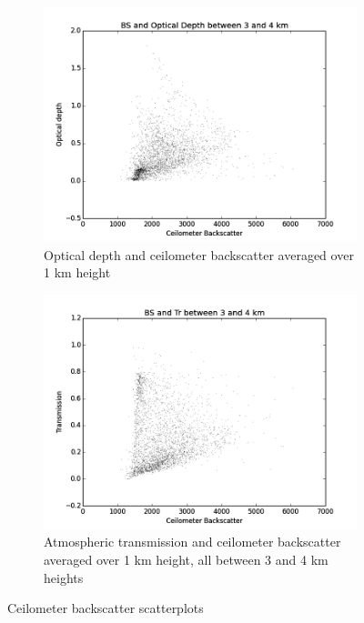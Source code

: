 \documentclass[a4paper,titlepage, twoside]{report}
\begin{document}
\begin{figure}
\begin{subfigure}{0.48\textwidth}
\includegraphics[width=\textwidth]{BS3_tau.png}
\caption{Optical depth and ceilometer backscatter averaged over 1 km height}
\end{subfigure}
\hfill
\begin{subfigure}{0.48\textwidth}
\includegraphics[width=\textwidth]{BS3_Tr.png}
\caption{Atmospheric transmission and ceilometer backscatter averaged over 1 km height, all  between 3 and 4 km heights}
\end{subfigure}
\caption{Ceilometer backscatter scatterplots}
\label{fig:data-11}
\end{figure}
\end{document}
